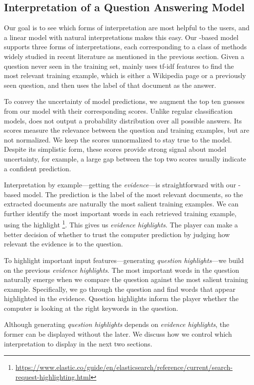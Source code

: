 \subsection{Interpretation of a Question Answering Model}


Our goal is to see which forms of interpretation are most
helpful to the users, and a linear model with natural
interpretations makes this easy.  Our -based \qb{} model
supports three forms of interpretations, each corresponding to a class
of methods widely studied in recent literature as mentioned in the
previous section.
Given a question never seen in the training set,  mainly uses
tf-idf features to find the
most relevant training example, which is either a Wikipedia page or a
previously seen \qb{} question, and then uses the label of that
document as the answer.

To convey the uncertainty of model predictions, we augment the top ten
guesses from our model with their corresponding scores. 
Unlike regular classification models,  does not output 
a probability distribution over all possible answers.  Its scores
measure the relevance between the question and training examples, but
are not normalized.
We keep the scores unnormalized to stay true to the model.
Despite its simplistic form, these scores provide strong
signal about model uncertainty, for example, a large gap between the
top two scores usually indicate a confident prediction.

Interpretation by example---getting the \emph{evidence}---is
straightforward with our -based model.
The prediction is the label of the most relevant documents, so
the extracted documents are naturally the most salient training
examples.  We can further identify the most important words in each
retrieved training example, using the highlight
\footnote{\url{https://www.elastic.co/guide/en/elasticsearch/reference/current/search-request-highlighting.html}}.
This gives us \emph{evidence highlights}.
The player can make a better decision of whether to trust the computer
prediction by judging how relevant the evidence is to the question.

To highlight important input features---generating \emph{question
highlights}---we build on the previous \emph{evidence highlights}.
The most
important words in the question naturally emerge when we compare the
question against the most salient training example.  Specifically, we
go through the question and find words that appear highlighted in the
evidence. Question highlights inform the player whether the computer
is looking at the right keywords in the question.

Although generating \emph{question highlights} depends on
\emph{evidence highlights}, the former can be displayed without the
later. We discuss how we control which interpretation to display in
the next two sections.
